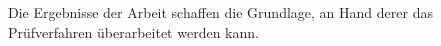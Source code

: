 Die Ergebnisse der Arbeit schaffen die Grundlage, an Hand derer das Prüfverfahren überarbeitet werden kann.













\begin{comment}
Die von der Firma Bihler entwickelten und produzierten NC Aggregate werden in ihren Stanz-Biegeautomaten zum Ausführen von schnellen und exakten Werzeugbewegungen eingesetzt. Da das verwendete Prüfverfahren der NCAs nicht zuverlässig Fehler bei deren Produktion in der Serie aufdeckt, wird das Verfahren analysiert und seine Schwachpunkte im Einzelnen aufgezeigt. 

Hierzu wird der Aufbau der verschiedenen Varianten der NCAs dargestellt, die elektronische Ansteuerung unter Zuhilfenahme des Kurvengetriebes erläutert und die Fahrbewegung der NCAs im Trapez- und Dreiecksprofil aufgezeigt.

Es wird festgestellt, dass Funktionsstörungen der NCAs die verschiedensten Ursachen haben und alle am Produktionsprozess Beteiligten damit konfrontiert sind.

Der derzeitige Testlauf auf einem Prüfstand integriert das Einlaufen der Aggregate und erfasst beim kompletten Ein- und Ausfahren der Pinole während eines bestimmten Testzyklus im Bewegungsprofil Trapez Stromstärke und verschiedene Temperaturwerte. Hierdurch können Fehler aber nicht zuverlässig aufgedeckt werden, zumal keine Standards für die funktionsspezifischen Eigenschaften der NCA vorhanden sind und es kein Dokumentationssystem zur Erfassung von Problemen und deren Rückmeldung an die entsprechenden Abteilungen gibt.


Nach einer Auseinandersetzung mit den Grundlagen von Prüfkonzepten und Testverfahren werden deshalb teilweise auf der Grundlage des bisherigen Testablaufs entwickelte Testverfahren geprüft und bewertet.

Dabei ist das bisher schon eingesetzte langsame Abfahren im Trapezprofil wenig geeignet, da die Einflüsse des Reglers nicht erkennen lassen, ob eine Schwergängigkeit vorliegt. 

Aufgrund der Versuche kann davon ausgegangen werden, dass man weitreichende Erkenntnisse zu etwaigen Störungen durch das Belasten der NCAs beim Betreiben erhält. Da sich Tests mit einem direkten Belasten der Achse durch Anhängen einer Last oder Fahren gegen einen Widerstand nicht als praxistauglich erweisen, werden Messungen analysiert, die aufgrund des Fahrprofils die Achsen dynamisch belasten. Es bietet sich an, die Verfahrprofile Stufenprofil und Polynom 5. Ordnung einzusetzen, denn mit ihnen können die Achsen bis an die Belastungsgrenzen belastet werden und es lässt sich axiales Spiel erkennen. Weiterhin lassen sich diese Messungen leicht in den vorhandenen Prüfablauf integrieren.


\end{comment}
